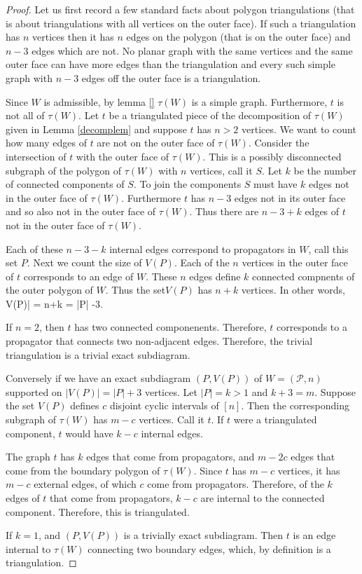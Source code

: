 \documentclass[11pt]{article}
\def\bas #1\eas{\begin{align*} #1 \end{align*}}
\newcommand{\cP}{\mathcal{P}}
\theoremstyle{remark}
\theoremstyle{definition}
\begin{document}
\begin{proof}
  Let us first record a few standard facts about polygon triangulations (that is about triangulations with all vertices on the outer face).  If such a triangulation has $n$ vertices then it has $n$ edges on the polygon (that is on the outer face) and $n-3$ edges which are not.  No planar graph with the same vertices and the same outer face can have more edges than the triangulation and every such simple graph with $n-3$ edges off the outer face is a triangulation.

  Since $W$ is admissible, by lemma \ref{} $\tau(W)$ is a simple graph. Furthermore, $t$ is not all of $\tau(W)$.
  Let $t$ be a triangulated piece of the decomposition of $\tau(W)$ given in Lemma \ref{decomplem} and suppose $t$ has $n>2$ vertices.  We want to count how many edges of $t$ are not on the outer face of $\tau(W)$.  Consider the intersection of $t$ with the outer face of $\tau(W)$.  This is a possibly disconnected subgraph of the polygon of $\tau(W)$ with $n$ vertices, call it $S$.  Let $k$ be the number of connected components of $S$.   To join the components $S$ must have $k$ edges not in the outer face of $\tau(W)$.  Furthermore $t$ has $n-3$ edges not in its outer face and so also not in the outer face of $\tau(W)$.  Thus there are $n-3+k$ edges of $t$ not in the outer face of $\tau(W)$.

  Each of these $n-3-k$ internal edges correspond to propagators in $W$, call this set $P$.  Next we count the size of $V(P)$.  Each of the $n$ vertices in the outer face of $t$ corresponds to an edge of $W$. These $n$ edges define $k$ connected compnents of the outer polygon of $W$. Thus the set$V(P)$ has $n+k$ vertices.  In other words, \bas |V(P)| = n+k = |P| -3\;.\eas

If $n=2$, then $t$ has two connected componenents. Therefore, $t$ corresponds to a propagator that connects two non-adjacent edges. Therefore, the trivial triangulation is a trivial exact subdiagram.

  Conversely if we have an exact subdiagram $(P, V(P))$ of $W = (\cP, n)$ supported on $|V(P)| = |P|+3$ vertices. Let $|P| = k>1$ and $k+3 = m$. Suppose the set $V(P)$ defines $c$ disjoint cyclic intervals of $[n]$. Then the corresponding subgraph of $\tau(W)$ has $m-c$ vertices. Call it $t$. If $t$ were a triangulated component, $t$ would have $k -c$ internal edges.

  The graph $t$ has $k$ edges that come from propagators, and $m - 2c$ edges that come from the boundary polygon of $\tau(W)$. Since $t$ has $m-c$ vertices, it has $m-c$ external edges, of which $c$ come from propagators. Therefore, of the $k$ edges of $t$ that come from propagators, $k-c$ are internal to the connected component. Therefore, this is triangulated.

  If $k=1$, and $(P, V(P))$ is a trivially exact subdiagram. Then $t$ is an edge internal to $\tau(W)$ connecting two boundary edges, which, by definition is a triangulation.


\end{proof}
\end{document}
